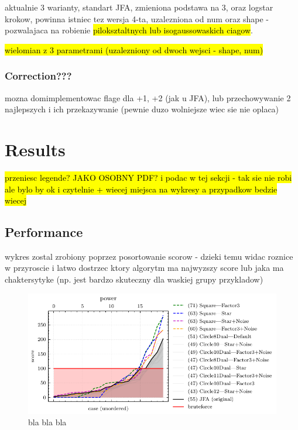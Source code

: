 \documentclass{article}
\begin{document}
aktualnie 3 warianty, standart JFA, zmieniona podstawa na 3, oraz logstar krokow,
powinna istniec tez wersja 4-ta, uzalezniona od num oraz shape - pozwalajaca na
robienie \hl{piloksztaltnych lub isogaussowaskich ciagow}.

\hl{wielomian z 3 parametrami (uzalezniony od dwoch
wejsci - shape, num)}

\subsubsection{Correction???} %

mozna domimplementowac flage dla +1, +2 (jak u JFA), lub przechowywanie 2
najlepszych i ich przekazywanie (pewnie duzo wolniejsze wiec sie nie oplaca)

\section{Results} %

\hl {przeniesc legende? JAKO OSOBNY PDF? i podac w tej sekcji - tak sie nie robi
ale bylo by ok i czytelnie + wiecej miejsca na wykresy a przypadkow bedzie
wiecej}

\subsection{Performance} %

wykres zostal zrobiony poprzez posortowanie scorow - dzieki temu widac roznice w
przyroscie i latwo dostrzec ktory algorytm ma najwyzszy score lub jaka ma
chaktersytyke (np. jest bardzo skuteczny dla waskiej grupy przykladow)

\begin{figure}[H]
	\centering
	\includegraphics[width=\linewidth]{../figures/figure-4-power}
	\caption{bla bla bla}
	\label{fig:abstract}
\end{figure}
\end{document}
